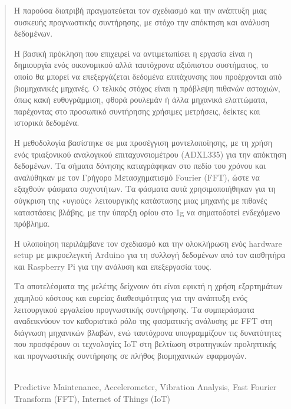 
\begin{abstract}
Η παρούσα διατριβή πραγματεύεται τον σχεδιασμό και την ανάπτυξη μιας συσκευής προγνωστικής συντήρησης, με στόχο την απόκτηση και ανάλυση δεδομένων. 

Η βασική πρόκληση που επιχειρεί να αντιμετωπίσει η εργασία είναι η δημιουργία ενός οικονομικού αλλά ταυτόχρονα αξιόπιστου συστήματος, το οποίο θα μπορεί να επεξεργάζεται δεδομένα επιτάχυνσης που προέρχονται από βιομηχανικές μηχανές. Ο τελικός στόχος είναι η πρόβλεψη πιθανών αστοχιών, όπως κακή ευθυγράμμιση, φθορά ρουλεμάν ή άλλα μηχανικά ελαττώματα, παρέχοντας στο προσωπικό συντήρησης χρήσιμες μετρήσεις, δείκτες και ιστορικά δεδομένα. 

Η μεθοδολογία βασίστηκε σε μια προσέγγιση μοντελοποίησης, με τη χρήση ενός τριαξονικού αναλογικού επιταχυνσιομέτρου (ADXL335) για την απόκτηση δεδομένων. Τα σήματα δόνησης καταγράφηκαν στο πεδίο του χρόνου και αναλύθηκαν με τον Γρήγορο Μετασχηματισμό Fourier (FFT), ώστε να εξαχθούν φάσματα συχνοτήτων. Τα φάσματα αυτά χρησιμοποιήθηκαν για τη σύγκριση της «υγιούς» λειτουργικής κατάστασης μιας μηχανής με πιθανές καταστάσεις βλάβης, με την ύπαρξη ορίου στο 1g να σηματοδοτεί ενδεχόμενο πρόβλημα.

Η υλοποίηση περιλάμβανε τον σχεδιασμό και την ολοκλήρωση ενός hardware setup με μικροελεγκτή Arduino για τη συλλογή δεδομένων από τον αισθητήρα και Raspberry Pi για την ανάλυση και επεξεργασία τους.

Τα αποτελέσματα της μελέτης δείχνουν ότι είναι εφικτή η χρήση εξαρτημάτων χαμηλού κόστους και ευρείας διαθεσιμότητας για την ανάπτυξη ενός λειτουργικού εργαλείου προγνωστικής συντήρησης. Τα συμπεράσματα αναδεικνύουν τον καθοριστικό ρόλο της φασματικής ανάλυσης με FFT στη διάγνωση μηχανικών βλαβών, ενώ ταυτόχρονα υπογραμμίζουν τις δυνατότητες που προσφέρουν οι τεχνολογίες IoT στη βελτίωση στρατηγικών προληπτικής και προγνωστικής συντήρησης σε πλήθος βιομηχανικών εφαρμογών.

\vspace*{\fill}
\\ 
Predictive Maintenance, Accelerometer, Vibration Analysis, Fast Fourier Transform (FFT), Internet of Things (IoT)
\end{abstract}







